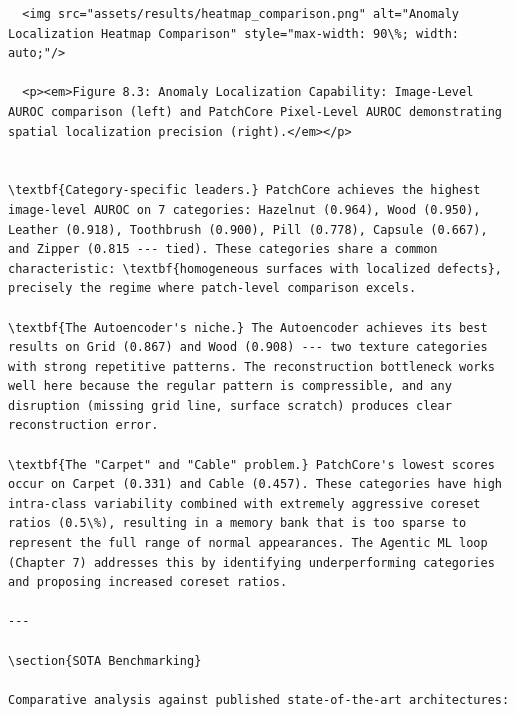 \documentclass[12pt,a4paper,oneside]{report}
\begin{document}
\begin{verbatim}
  <img src="assets/results/heatmap_comparison.png" alt="Anomaly Localization Heatmap Comparison" style="max-width: 90\%; width: auto;"/>
  
  <p><em>Figure 8.3: Anomaly Localization Capability: Image-Level AUROC comparison (left) and PatchCore Pixel-Level AUROC demonstrating spatial localization precision (right).</em></p>


\textbf{Category-specific leaders.} PatchCore achieves the highest image-level AUROC on 7 categories: Hazelnut (0.964), Wood (0.950), Leather (0.918), Toothbrush (0.900), Pill (0.778), Capsule (0.667), and Zipper (0.815 --- tied). These categories share a common characteristic: \textbf{homogeneous surfaces with localized defects}, precisely the regime where patch-level comparison excels.

\textbf{The Autoencoder's niche.} The Autoencoder achieves its best results on Grid (0.867) and Wood (0.908) --- two texture categories with strong repetitive patterns. The reconstruction bottleneck works well here because the regular pattern is compressible, and any disruption (missing grid line, surface scratch) produces clear reconstruction error.

\textbf{The "Carpet" and "Cable" problem.} PatchCore's lowest scores occur on Carpet (0.331) and Cable (0.457). These categories have high intra-class variability combined with extremely aggressive coreset ratios (0.5\%), resulting in a memory bank that is too sparse to represent the full range of normal appearances. The Agentic ML loop (Chapter 7) addresses this by identifying underperforming categories and proposing increased coreset ratios.

---

\section{SOTA Benchmarking}

Comparative analysis against published state-of-the-art architectures:


\end{verbatim}
\end{document}
